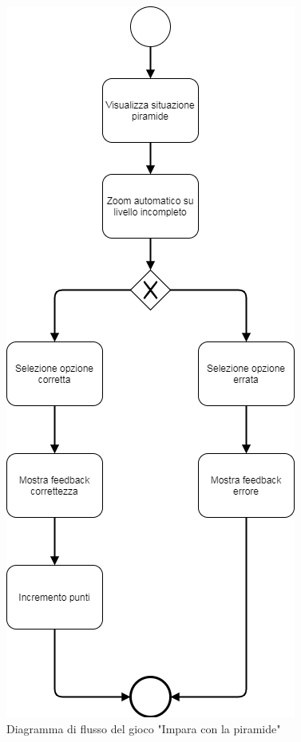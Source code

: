 \begin{figure}[htbp]
\centering
\includegraphics[scale=0.6]{Images/Flussopiramide}
\caption{Diagramma di flusso del gioco "Impara con la piramide"}
\label{fig:Diagramma di flusso del gioco "Impara con la piramide"}
\end{figure}
\clearpage


